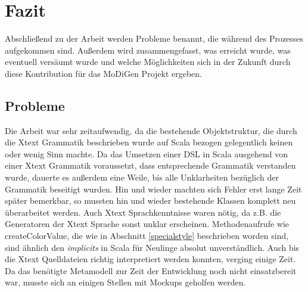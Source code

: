 \chapter{Fazit}
Abschließend zu der Arbeit werden Probleme benannt, die während des Prozesses aufgekommen sind. Außerdem wird zusammengefasst, was erreicht wurde, was eventuell versäumt wurde und welche Möglichkeiten sich in der Zukunft durch diese Kontribution für das MoDiGen Projekt ergeben.
\section{Probleme}
Die Arbeit war sehr zeitaufwendig, da die bestehende Objektstruktur, die durch die Xtext Grammatik beschrieben wurde auf Scala bezogen gelegentlich keinen oder wenig Sinn machte. Da das Umsetzen einer DSL in Scala ausgehend von einer Xtext Grammatik voraussetzt, dass entsprechende Grammatik verstanden wurde, dauerte es außerdem eine Weile, bis alle Unklarheiten bezüglich der Grammatik beseitigt wurden. Hin und wieder machten sich Fehler erst lange Zeit später bemerkbar, so mussten hin und wieder bestehende Klassen komplett neu überarbeitet werden. Auch Xtext Sprachkenntnisse waren nötig, da z.B. die Generatoren der Xtext Sprache sonst unklar erscheinen.
Methodenaufrufe wie createColorValue, die wie in Abschnitt \ref{specialstyle} beschrieben worden sind, sind ähnlich den \textit{implicits} in Scala für Neulinge absolut unverständlich. Auch bis die Xtext Quelldateien richtig interpretiert werden konnten, verging einige Zeit.
Da das benötigte Metamodell zur Zeit der Entwicklung noch nicht einsatzbereit war, musste sich an einigen Stellen mit Mockups geholfen werden.
